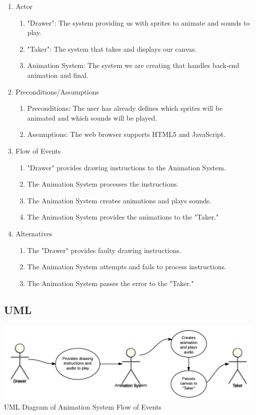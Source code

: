 \documentclass[12pt]{article}
\begin{document}
\begin{enumerate}
  \item Actor
  \begin{enumerate}
  		\item "Drawer": The system providing us with sprites to animate and sounds to play.
   		 \item "Taker": The system that takes and displays our canvas.
		\item Animation System: The system we are creating that handles back-end animation and final.
  \end{enumerate}
  \item Preconditions/Assumptions
  \begin{enumerate}
   		 \item Preconditions: The user has already defines which sprites will be animated and which sounds will be played.
   		 \item Assumptions: The web browser supports HTML5 and JavaScript.
  \end{enumerate}
  \item Flow of Events
  \begin{enumerate}
   		 \item "Drawer" provides drawing instructions to the Animation System. 
   		 \item The Animation System processes the instructions.
		\item The Animation System creates animations and plays sounds.
		\item The Animation System provides the animations to the "Taker."
  \end{enumerate}
  \item Alternatives
  \begin{enumerate}
    		\item The "Drawer" provides faulty drawing instructions.
    		\item The Animation System attempts and fails to process instructions.
		\item The Animation System passes the error to the "Taker."
  \end{enumerate}
\end{enumerate}

	

\subsection{UML}
\includegraphics[scale=.4]{UML.png}
UML Diagram of Animation System Flow of Events
\end{document}
